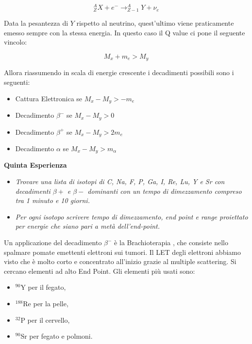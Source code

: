 \documentclass [a4paper, twoside] {book}
\begin{document}
\begin{equation}
^A_ZX+e^- \longrightarrow _{Z-1}^AY+\nu_e
\end{equation}

Data la pesantezza di $Y$ rispetto al neutrino, quest'ultimo viene praticamente emesso sempre con la stessa energia. In questo caso il Q value ci pone il seguente vincolo:

\begin{equation}
M_x+m_e>M_y
\end{equation}

Allora riassumendo in scala di energie crescente i decadimenti possibili sono i seguenti:

\begin{itemize}
\item Cattura Elettronica se $M_x-M_y>-m_e$
\item Decadimento $\beta^-$ se $M_x-M_y>0$
\item Decadimento $\beta^+$ se $M_x-M_y>2m_e$
\item Decadimento $\alpha$ se $M_x-M_y>m_{\alpha}$
\end{itemize}

\textbf{Quinta Esperienza}\\

\begin{itemize}
\item \emph{Trovare una lista di isotopi di C, Na, F, P, Ga, I, Re, Lu, Y e Sr con decadimenti $\beta+$ e $\beta-$ dominanti con un tempo di dimezzamento compreso tra 1 minuto e 10 giorni.}
\item \emph{Per ogni isotopo scrivere tempo di dimezzamento, end point e range proiettato per energie che siano pari a metà dell'end-point.}
\end{itemize}



Un applicazione del decadimento $\beta^-$ è la Brachioterapia \cite{Brachioterapia}, che consiste nello spalmare pomate emettenti elettroni sui tumori. Il LET degli elettroni abbiamo visto che è molto corto e concentrato all'inizio grazie al multiple scattering. Si cercano elementi ad alto End Point. Gli elementi più usati sono:
\begin{itemize}
\item $^{90}\text{Y}$ per il fegato,
\item $^{188}\text{Re}$ per la pelle,
\item $^{32}\text{P}$ per il cervello,
\item $^{90}\text{Sr}$ per fegato e polmoni.
\end{itemize}
\end{document}
